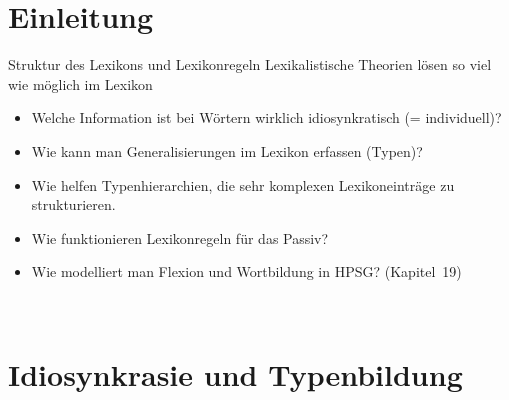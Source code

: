\section{Einleitung}

\begin{frame}
  {Struktur des Lexikons und Lexikonregeln}
  \onslide<+->
  \onslide<+->
  Lexikalistische Theorien lösen so viel wie möglich im Lexikon\\
  \Zeile
  \begin{itemize}[<+->]
    \item Welche Information ist bei Wörtern wirklich idiosynkratisch (= individuell)?
    \item Wie kann man Generalisierungen im Lexikon erfassen (Typen)?
    \item Wie helfen Typenhierarchien, die sehr komplexen Lexikoneinträge zu strukturieren.
      \Halbzeile
    \item Wie funktionieren Lexikonregeln für das Passiv?
    \item Wie modelliert man Flexion und Wortbildung in HPSG? (Kapitel~19)
  \end{itemize}
  \Zeile
  \onslide<+->
  \centering 
  \\
\end{frame}

\section{Idiosynkrasie und Typenbildung}

